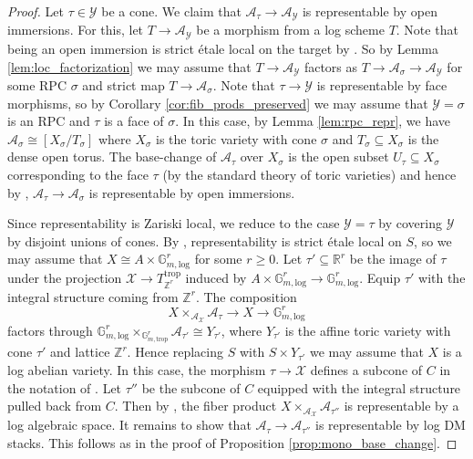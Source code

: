 \documentclass[11pt]{amsart}
\theoremstyle{definition}
\theoremstyle{remark}
\def\log{\mathrm{log}}
\def\trop{\mathrm{trop}}
\begin{document}
\begin{proof}
	Let $\tau\in \mathcal{Y}$ be a cone. We claim that $\mathcal{A}_{\tau}\to \mathcal{A}_{\mathcal{Y}}$ is representable by
	open immersions. For this, let $T\to \mathcal{A}_{\mathcal{Y}}$ be a morphism from a log scheme $T$. Note that
	being an open immersion is strict étale local on the target by \cite[Tag 02L3]{stacks-project}. So by Lemma \ref{lem:loc_factorization}
	we may assume that $T\to \mathcal{A}_{\mathcal{Y}}$ factors as
	$T\to \mathcal{A}_{\sigma}\to \mathcal{A}_{\mathcal{Y}}$ for some RPC $\sigma$ and strict map $T\to \mathcal{A}_{\sigma}$.
	Note that $\tau\to \mathcal{Y}$ is representable by face morphisms, so by Corollary \ref{cor:fib_prods_preserved}
	we may assume that $\mathcal{Y}=\sigma$ is an RPC and $\tau$ is a face of $\sigma$. In this case, by Lemma \ref{lem:rpc_repr},
	we have $\mathcal{A}_{\sigma}\cong [X_{\sigma}/T_{\sigma}]$ where $X_{\sigma}$ is the toric variety with cone $\sigma$
	and $T_{\sigma} \subseteq X_{\sigma}$ is the dense open torus. The base-change of $\mathcal{A}_{\tau}$ over $X_{\sigma}$
	is the open subset $U_{\tau}\subseteq X_{\sigma}$ corresponding to the face $\tau$ (by the standard theory of toric
	varieties) and hence by \cite[Tag 02L3]{stacks-project}, $\mathcal{A}_{\tau}\to \mathcal{A}_{\sigma}$ is representable
	by open immersions.

	Since representability is Zariski local, we reduce to the case $\mathcal{Y}=\tau$ by covering $\mathcal{Y}$ by disjoint
	unions of cones. By
	\cite[Theorem 1.1 (3)]{fortman2025descentalgebraicstacks},
	representability is strict étale local on $S$, so we may
	assume that $X\cong A\times \mathbb{G}_{m,\log}^{r}$
	for some $r\ge 0$. Let $\tau'\subseteq \mathbb{R}^{r}$ be the image of $\tau$
	under the projection $\mathcal{X}\to T_{\mathbb{Z}^{r}}^{\trop}$
	induced by $A\times \mathbb{G}_{m,\log}^{r}\to \mathbb{G}_{m,\log}^{r}$.
	Equip $\tau'$ with the integral structure coming from
	$\mathbb{Z}^{r}$. The composition
	$$X\times_{\mathcal{A}_{\mathcal{X}}}\mathcal{A}_{\tau}\to X\to \mathbb{G}_{m,\log}^{r}$$
	factors through $\mathbb{G}_{m,\log}^{r}\times_{\mathbb{G}_{m,\trop}^{r}}\mathcal{A}_{\tau'}\cong Y_{\tau'}$,
	where $Y_{\tau'}$ is the affine toric variety with cone $\tau'$
	and lattice $\mathbb{Z}^{r}$.
	Hence replacing $S$ with $S\times Y_{\tau'}$ we may assume that
	$X$ is a log abelian variety. In this case, the morphism
	$\tau\to \mathcal{X}$ defines a subcone of $C$ in the
	notation of \cite[2.2]{LogarithmicAbeKajiwa2015}.
	Let $\tau''$ be the subcone of $C$ equipped with the integral
	structure pulled back from $C$. Then by \cite[Theorem 8.1]{LogarithmicAbeKajiwa2015},
	the fiber product $X\times_{\mathcal{A}_{\mathcal{X}}}\mathcal{A}_{\tau''}$ is
	representable by a log algebraic space. It remains to show
	that $\mathcal{A}_{\tau}\to \mathcal{A}_{\tau''}$ is
	representable by log DM stacks. This follows as in the proof
	of Proposition \ref{prop:mono_base_change}.
\end{proof}
\end{document}
